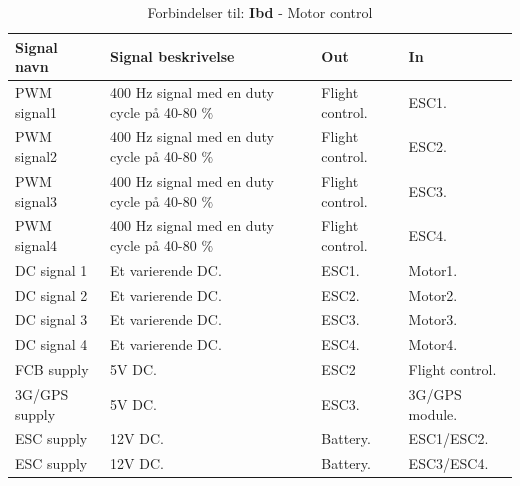 \begin{table}[H]
	\centering
		\begin{tabular}{|p{2.7 cm}|p{5.5 cm}|p{2.5 cm}|p{2.5 cm}|} 
		\hline
			\textbf{Signal navn} 	& \textbf{Signal beskrivelse}		& \textbf{Out} 				& \textbf{In}     \\ \hline
			PWM signal1 & 400 Hz signal med en duty cycle på 40-80 $\%$ & Flight control. & ESC1.	\\ \hline
			PWM signal2 & 400 Hz signal med en duty cycle på 40-80 $\%$ & Flight control. & ESC2.	\\ \hline
			PWM signal3 & 400 Hz signal med en duty cycle på 40-80 $\%$ & Flight control. &	ESC3. \\ \hline
			PWM signal4 & 400 Hz signal med en duty cycle på 40-80 $\%$ & Flight control. & ESC4. \\ \hline
			DC signal 1 & Et varierende DC. & ESC1. & Motor1.	\\ \hline
			DC signal 2 & Et varierende DC. & ESC2. & Motor2.	\\ \hline
			DC signal 3 & Et varierende DC. & ESC3. & Motor3.	\\ \hline
			DC signal 4 & Et varierende DC. & ESC4. & Motor4.	\\ \hline
			FCB supply & 5V DC. & ESC2 & Flight control.	\\ \hline
			3G/GPS supply & 5V DC. & ESC3. & 3G/GPS module.	\\ \hline
			ESC supply & 12V DC. & Battery. & ESC1/ESC2.	\\ \hline
			ESC supply & 12V DC. & Battery. & ESC3/ESC4.	\\ \hline
			
		\end{tabular}
	\caption{Forbindelser til: \textbf{Ibd} - Motor control}
	\label{tab:IBD_Motor_control}
\end{table}

